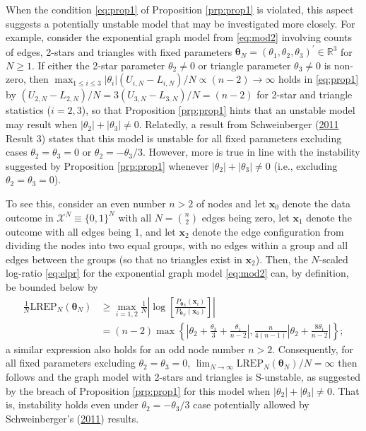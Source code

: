 \documentclass[]{article}
\theoremstyle{definition}
\newcommand{\REP}{\mathrm{LREP}}
\begin{document}
When the condition \eqref{eq:prop1} of Proposition \ref{prp:prop1} is
violated, this aspect suggests a potentially unstable model that may be
investigated more closely. For example, consider the exponential graph
model from \eqref{eq:mod2} involving counts of edges, 2-stars and
triangles with fixed parameters
\(\boldsymbol \theta_N = (\theta_{1},\theta_2,\theta_3)^\prime \in \mathbb{R}^3\)
for \(N\geq 1\). If either the 2-star parameter \(\theta_2 \neq 0\) or
triangle parameter \(\theta_3 \neq 0\) is non-zero, then
\(\max_{1 \leq i \leq 3 } |\theta_{i}|(U_{i,N}-L_{i,N})/N \propto (n-2)\to \infty\)
holds in \eqref{eq:prop1} by
\((U_{2,N}-L_{2,N})/N = 3 (U_{3,N}-L_{3,N})/N=(n-2)\) for 2-star and
triangle statistics (\(i=2,3\)), so that Proposition \ref{prp:prop1}
hints that an unstable model may result when
\(|\theta_2| + |\theta_3| \neq 0\). Relatedly, a result from
Schweinberger
(\protect\hyperlink{ref-schweinberger2011instability}{2011} Result 3)
states that this model is unstable for all fixed parameters excluding
cases \(\theta_2 =\theta_3=0\) or \(\theta_2 = - \theta_3/3\). However,
more is true in line with the instability suggested by Proposition
\ref{prp:prop1} whenever \(|\theta_2| + |\theta_3| \neq 0\) (i.e.,
excluding \(\theta_2 =\theta_3=0\)).

To see this, consider an even number \(n>2\) of nodes and let
\(\boldsymbol x_0\) denote the data outcome in
\(\mathcal{X}^N \equiv \{0,1\}^N\) with all \(N = {n \choose 2}\) edges
being zero, let \(\boldsymbol x_1\) denote the outcome with all edges
being 1, and let \(\boldsymbol x_2\) denote the edge configuration from
dividing the nodes into two equal groups, with no edges within a group
and all edges between the groups (so that no triangles exist in
\(\boldsymbol x_2\)). Then, the \(N\)-scaled log-ratio \eqref{eq:elpr} for
the exponential graph model \eqref{eq:mod2} can, by definition, be bounded
below by
\begin{align*}
\frac{1}{N}\REP_N(\boldsymbol \theta_N) &\geq \max_{i=1,2}\frac{1}{N}
\left| \log\left[ \frac{P_{\boldsymbol \theta_N}(\boldsymbol x_i)}{P_{\boldsymbol \theta_N}(\boldsymbol x_0)}\right] \right| \\
&= (n-2) \max\left\{ \left| \theta_2 + \frac{\theta_3}{3}+\frac{\theta_1}{n-2} \right|, \frac{n}{4(n-1)} \left| \theta_2 + \frac{8\theta_1}{n-2} \right| \right\};
\end{align*}
a similar expression also holds for an odd node number \(n>2\).
Consequently, for all fixed parameters excluding
\(\theta_2=\theta_3=0\),
\(\lim_{N\to \infty}\REP_N(\boldsymbol \theta_N)/N=\infty\) then follows
and the graph model with 2-stars and triangles is S-unstable, as
suggested by the breach of Proposition \ref{prp:prop1} for this model
when \(|\theta_2|+|\theta_3|\neq 0\). That is, instability holds even
under \(\theta_2 = - \theta_3/3\) case potentially allowed by
Schweinberger's
(\protect\hyperlink{ref-schweinberger2011instability}{2011}) results.
\end{document}
